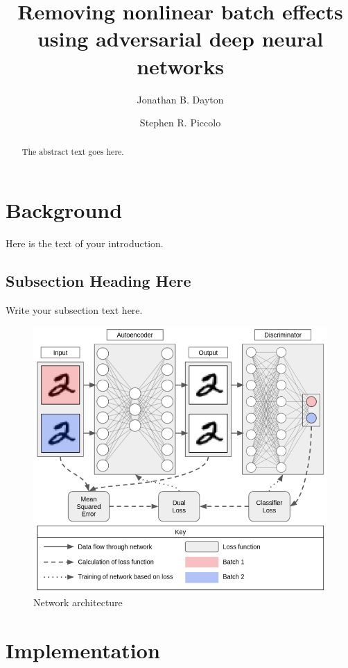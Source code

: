 \documentclass[titlepage]{article}
\begin{document}
\title{Removing nonlinear batch effects using adversarial deep neural networks}
\author[1]{Jonathan B. Dayton}
\author[1,2]{Stephen R. Piccolo}

\maketitle

\begin{abstract}
	The abstract text goes here.
\end{abstract}

\section{Background}
Here is the text of your introduction.

\subsection{Subsection Heading Here}
Write your subsection text here.

\begin{figure}
	\centering
	\includegraphics[width=4.5in]{figures/network}
	\caption{Network architecture}
	\label{simulationfigure}
\end{figure}

\section{Implementation}
\end{document}
